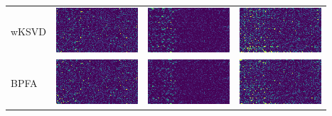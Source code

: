 \begin{tabular}{m{2cm}*{3}{M{0.24\textwidth}}}
    wKSVD&
    \includegraphics[width=\tmplength]{img/chapitre4/figure7/R2_wKSVD_band_0.png}&
    \includegraphics[width=\tmplength]{img/chapitre4/figure7/R2_wKSVD_band_1.png}&
    \includegraphics[width=\tmplength]{img/chapitre4/figure7/R2_wKSVD_band_2.png}\\
    BPFA&
    \includegraphics[width=\tmplength]{img/chapitre4/figure7/R2_BPFA_band_0.png}&
    \includegraphics[width=\tmplength]{img/chapitre4/figure7/R2_BPFA_band_1.png}&
    \includegraphics[width=\tmplength]{img/chapitre4/figure7/R2_BPFA_band_2.png}\\
\end{tabular}